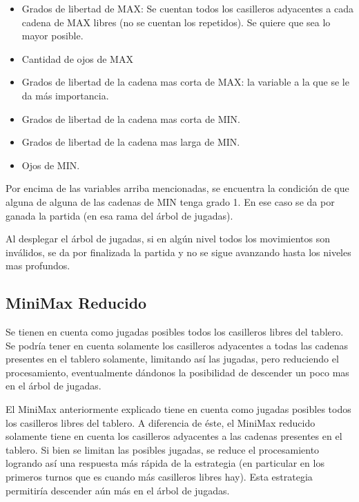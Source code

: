 \documentclass[11pt]{article}
\begin{document}
   \begin{itemize}
      \item Grados de libertad de MAX: Se cuentan todos los casilleros
        adyacentes a cada cadena de MAX libres (no se cuentan los
        repetidos). Se quiere que sea lo mayor posible.
      \item Cantidad de ojos de MAX
      \item Grados de libertad de la cadena mas corta de MAX: la
        variable a la que se le da m\'as importancia.
      \item Grados de libertad de la cadena mas corta de MIN.
      \item Grados de libertad de la cadena mas larga de MIN.
      \item Ojos de MIN.
   \end{itemize}
   
   Por encima de las variables arriba mencionadas, se encuentra la
   condici\'on de que alguna de alguna de las cadenas de MIN tenga
   grado 1. En ese caso se da por ganada la partida (en esa rama del
   \'arbol de jugadas).

   Al desplegar el \'arbol de jugadas, si en alg\'un nivel todos los
   movimientos son inv\'alidos, se da por finalizada la partida y no
   se sigue avanzando hasta los niveles mas profundos.

\subsection {MiniMax Reducido}

Se tienen en cuenta como jugadas posibles todos los
       casilleros libres del tablero. Se podr\'ia tener en cuenta
       solamente los casilleros adyacentes a todas las cadenas
       presentes en el tablero solamente, limitando as\'i las jugadas,
       pero reduciendo el procesamiento, eventualmente d\'andonos la
       posibilidad de descender un poco mas en el \'arbol de jugadas.

El MiniMax anteriormente explicado tiene en cuenta como jugadas posibles todos los casilleros libres del tablero. 
A diferencia de \'este, el MiniMax reducido solamente tiene en cuenta los casilleros adyacentes a las cadenas presentes en el tablero.
Si bien se limitan las posibles jugadas, se reduce el procesamiento logrando as\'i una respuesta m\'as r\'apida de la estrategia
(en particular en los primeros turnos que es cuando m\'as casilleros libres hay). Esta estrategia permitir\'ia descender a\'un m\'as en el 
\'arbol de jugadas.
\end{document}
